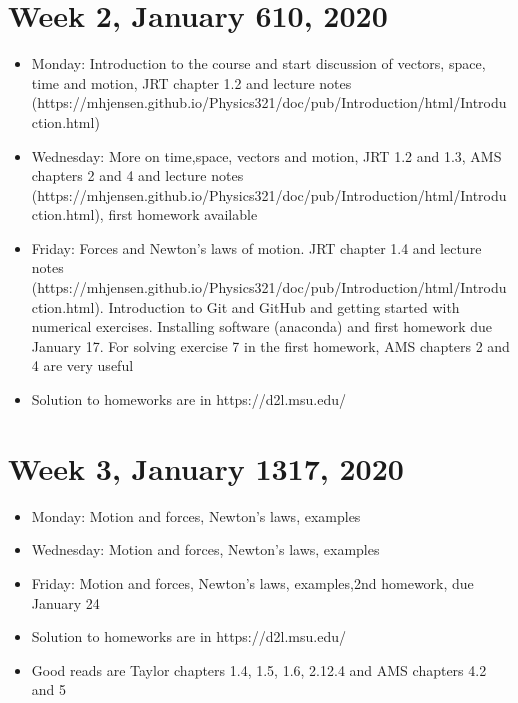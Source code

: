 \documentclass[letterpaper,10pt,english]{sphinxmanual}
\begin{document}
\section{Week 2, January 6\sphinxhyphen{}10, 2020}
\label{\detokenize{intro:week-2-january-6-10-2020}}\begin{itemize}
\item {} 
Monday: Introduction to the course and start discussion of vectors, space, time and motion, JRT chapter 1.2 and lecture notes (https://mhjensen.github.io/Physics321/doc/pub/Introduction/html/Introduction.html)

\item {} 
Wednesday: More on time,space, vectors and motion, JRT 1.2 and 1.3, AMS chapters 2 and 4  and lecture notes (https://mhjensen.github.io/Physics321/doc/pub/Introduction/html/Introduction.html), first homework available

\item {} 
Friday: Forces and Newton’s laws of motion. JRT chapter 1.4 and lecture notes (https://mhjensen.github.io/Physics321/doc/pub/Introduction/html/Introduction.html). Introduction to Git and GitHub and getting started with numerical exercises. Installing software (anaconda) and first homework due January 17. For solving exercise 7 in the first homework, AMS chapters 2 and 4 are very useful

\item {} 
Solution to homeworks are in https://d2l.msu.edu/

\end{itemize}


\section{Week 3, January 13\sphinxhyphen{}17, 2020}
\label{\detokenize{intro:week-3-january-13-17-2020}}\begin{itemize}
\item {} 
Monday: Motion and forces, Newton’s laws, examples

\item {} 
Wednesday: Motion and forces, Newton’s laws, examples

\item {} 
Friday:  Motion and forces, Newton’s laws, examples,2nd homework, due January 24

\item {} 
Solution to homeworks are in https://d2l.msu.edu/

\item {} 
Good reads are Taylor chapters 1.4, 1.5, 1.6, 2.1\sphinxhyphen{}2.4 and AMS chapters 4.2 and  5

\end{itemize}
\end{document}
